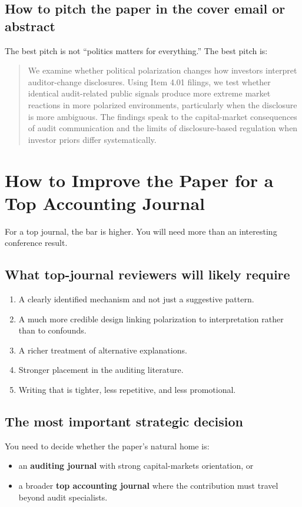 \documentclass[12pt]{article}
\begin{document}
\subsection*{How to pitch the paper in the cover email or abstract}
The best pitch is not ``politics matters for everything.'' The best pitch is:
\begin{quote}
We examine whether political polarization changes how investors interpret auditor-change disclosures. Using Item 4.01 filings, we test whether identical audit-related public signals produce more extreme market reactions in more polarized environments, particularly when the disclosure is more ambiguous. The findings speak to the capital-market consequences of audit communication and the limits of disclosure-based regulation when investor priors differ systematically.
\end{quote}

\section{How to Improve the Paper for a Top Accounting Journal}
For a top journal, the bar is higher. You will need more than an interesting conference result.

\subsection*{What top-journal reviewers will likely require}
\begin{enumerate}[leftmargin=2em]
    \item A clearly identified mechanism and not just a suggestive pattern.
    \item A much more credible design linking polarization to interpretation rather than to confounds.
    \item A richer treatment of alternative explanations.
    \item Stronger placement in the auditing literature.
    \item Writing that is tighter, less repetitive, and less promotional.
\end{enumerate}

\subsection*{The most important strategic decision}
You need to decide whether the paper's natural home is:
\begin{itemize}[leftmargin=2em]
    \item an \textbf{auditing journal} with strong capital-markets orientation, or
    \item a broader \textbf{top accounting journal} where the contribution must travel beyond audit specialists.
\end{itemize}
\end{document}
